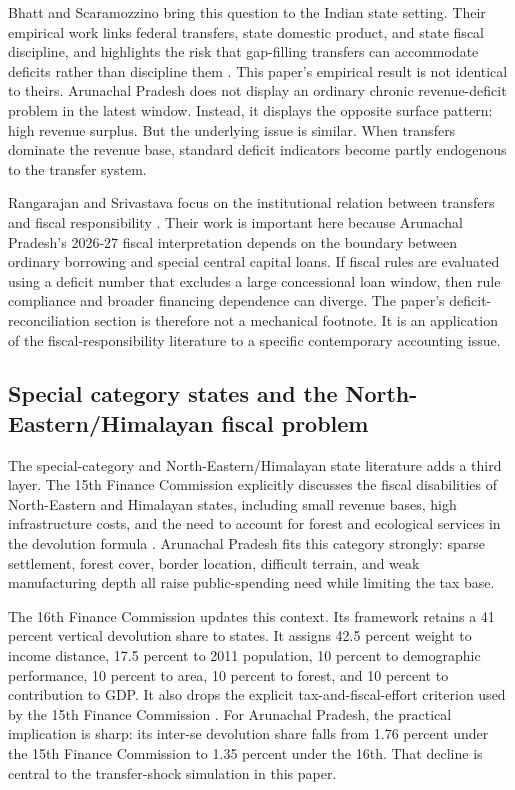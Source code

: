 \documentclass[11pt,a4paper]{article}
\begin{document}
Bhatt and Scaramozzino bring this question to the Indian state setting. Their empirical work links federal transfers, state domestic product, and state fiscal discipline, and highlights the risk that gap-filling transfers can accommodate deficits rather than discipline them \citep{bhatt_scaramozzino_2015}. This paper's empirical result is not identical to theirs. Arunachal Pradesh does not display an ordinary chronic revenue-deficit problem in the latest window. Instead, it displays the opposite surface pattern: high revenue surplus. But the underlying issue is similar. When transfers dominate the revenue base, standard deficit indicators become partly endogenous to the transfer system.

Rangarajan and Srivastava focus on the institutional relation between transfers and fiscal responsibility \citep{rangarajan_srivastava_2011}. Their work is important here because Arunachal Pradesh's 2026-27 fiscal interpretation depends on the boundary between ordinary borrowing and special central capital loans. If fiscal rules are evaluated using a deficit number that excludes a large concessional loan window, then rule compliance and broader financing dependence can diverge. The paper's deficit-reconciliation section is therefore not a mechanical footnote. It is an application of the fiscal-responsibility literature to a specific contemporary accounting issue.

\subsection{Special category states and the North-Eastern/Himalayan fiscal problem}

The special-category and North-Eastern/Himalayan state literature adds a third layer. The 15th Finance Commission explicitly discusses the fiscal disabilities of North-Eastern and Himalayan states, including small revenue bases, high infrastructure costs, and the need to account for forest and ecological services in the devolution formula \citep{fifteenth_fc_2020}. Arunachal Pradesh fits this category strongly: sparse settlement, forest cover, border location, difficult terrain, and weak manufacturing depth all raise public-spending need while limiting the tax base.

The 16th Finance Commission updates this context. Its framework retains a 41 percent vertical devolution share to states. It assigns 42.5 percent weight to income distance, 17.5 percent to 2011 population, 10 percent to demographic performance, 10 percent to area, 10 percent to forest, and 10 percent to contribution to GDP. It also drops the explicit tax-and-fiscal-effort criterion used by the 15th Finance Commission \citep{sixteenth_fc_2026,prs16fc}. For Arunachal Pradesh, the practical implication is sharp: its inter-se devolution share falls from 1.76 percent under the 15th Finance Commission to 1.35 percent under the 16th. That decline is central to the transfer-shock simulation in this paper.
\end{document}
